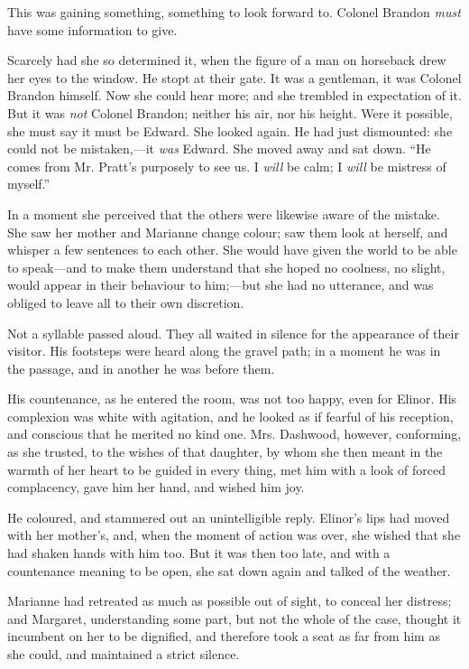 This was gaining something, something to look forward to. Colonel Brandon {\em must} have some information to give.

Scarcely had she so determined it, when the figure of a man on horseback drew her eyes to the window. He stopt at their gate. It was a gentleman, it was Colonel Brandon himself. Now she could hear more; and she trembled in expectation of it. But it was {\em not} Colonel Brandon; neither his air, nor his height. Were it possible, she must say it must be Edward. She looked again. He had just dismounted: she could not be mistaken,---it {\em was} Edward. She moved away and sat down. “He comes from Mr. Pratt's purposely to see us. I {\em will} be calm; I {\em will} be mistress of myself.”

In a moment she perceived that the others were likewise aware of the mistake. She saw her mother and Marianne change colour; saw them look at herself, and whisper a few sentences to each other. She would have given the world to be able to speak---and to make them understand that she hoped no coolness, no slight, would appear in their behaviour to him;---but she had no utterance, and was obliged to leave all to their own discretion.

Not a syllable passed aloud. They all waited in silence for the appearance of their visitor. His footsteps were heard along the gravel path; in a moment he was in the passage, and in another he was before them.

His countenance, as he entered the room, was not too happy, even for Elinor. His complexion was white with agitation, and he looked as if fearful of his reception, and conscious that he merited no kind one. Mrs. Dashwood, however, conforming, as she trusted, to the wishes of that daughter, by whom she then meant in the warmth of her heart to be guided in every thing, met him with a look of forced complacency, gave him her hand, and wished him joy.

He coloured, and stammered out an unintelligible reply. Elinor's lips had moved with her mother's, and, when the moment of action was over, she wished that she had shaken hands with him too. But it was then too late, and with a countenance meaning to be open, she sat down again and talked of the weather.

Marianne had retreated as much as possible out of sight, to conceal her distress; and Margaret, understanding some part, but not the whole of the case, thought it incumbent on her to be dignified, and therefore took a seat as far from him as she could, and maintained a strict silence.

